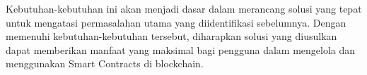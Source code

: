Kebutuhan-kebutuhan ini akan menjadi dasar dalam merancang solusi yang tepat untuk mengatasi permasalahan utama yang diidentifikasi sebelumnya. Dengan memenuhi kebutuhan-kebutuhan tersebut, diharapkan solusi yang diusulkan dapat memberikan manfaat yang maksimal bagi pengguna dalam mengelola dan menggunakan Smart Contracts di blockchain.

